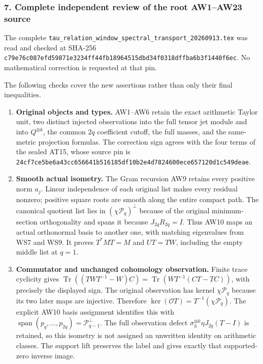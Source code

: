 \subsubsection{7. Complete independent review of the root AW1--AW23 source}\label{endpoint-window_review--complete-independent-review-of-the-root-aw1aw23-source}

The complete \nolinkurl{tau_relation_window_spectral_transport_20260913.tex} was read and checked at SHA-256 \nolinkurl{c79e76c087efd59871e3234ff44fb18964515dbd34f0318dffba6b3f1440f6ec}. No mathematical correction is requested at that pin.

The following checks cover the new assertions rather than only their final inequalities.

\begin{enumerate}
\def\labelenumi{\arabic{enumi}.}
\tightlist
\item
  \textbf{Original objects and types.} AW1--AW6 retain the exact arithmetic Taylor unit, two distinct injected observations into the full tensor jet module and into \(Q^{\otimes k}\), the common \(2q\) coefficient cutoff, the full masses, and the same-metric projection formulas. The correction sign agrees with the four terms of the sealed AT15, whose source pin is \nolinkurl{24cf7ce5be6a43cc656641b516185df10b2e4d7824600ece657120d1c549deae}.
\item
  \textbf{Smooth actual isometry.} The Gram recursion AW9 retains every positive norm \(a_j\). Linear independence of each original list makes every residual nonzero; positive square roots are smooth along the entire compact path. The canonical quotient list lies in \((\chi\mathcal P_q)^\perp\) because of the original minimum-section orthogonality and spans it because \(J_{2q}R_{2q}=I\). Thus AW10 maps an actual orthonormal basis to another one, with matching eigenvalues from WS7 and WS9. It proves \(T^*MT=M\) and \(UT=TW\), including the empty middle list at \(q=1\).
\item
  \textbf{Commutator and unchanged cohomology observation.} Finite trace cyclicity gives \(\operatorname{Tr}((TWT^{-1}-W)C)=\operatorname{Tr}(WT^{-1}(CT-TC))\), with precisely the displayed sign. The original observation has kernel \(\chi\mathcal P_q\) because its two later maps are injective. Therefore \(\ker(\mathcal O T)=T^{-1}(\chi\mathcal P_q)\). The explicit AW10 basis assignment identifies this with \(\operatorname{span}(p_q,\ldots,p_{2q})=\mathcal P_{q-1}^{\perp}\). The full observation defect \(\sigma_h^{\otimes k}\eta J_{2q}(T-I)\) is retained, so this isometry is not assigned an unwritten identity on arithmetic classes. The support lift preserves the label and gives exactly that supported-zero inverse image.

\end{enumerate}
